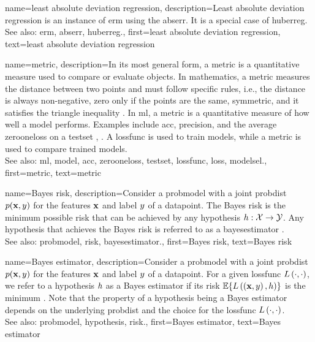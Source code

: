 {name={least absolute deviation regression},
 description={Least absolute deviation regression 
 	is an instance of \gls{erm} using the \gls{abserr}. It is a special case of \gls{huberreg}.
				\\
 See also: \gls{erm}, \gls{abserr}, \gls{huberreg}.},
 first={least absolute deviation regression},
 text={least absolute deviation regression}
}

{name={metric},
  description={In its most general form, a metric is a quantitative measure 
  		used to compare or evaluate objects. In mathematics, a metric measures the distance 
		between two points and must follow specific rules, i.e., the distance is always non-negative, 
		zero only if the points are the same, symmetric, and it satisfies the triangle inequality \cite{RudinBookPrinciplesMatheAnalysis}. 
		In \gls{ml}, a metric is a quantitative measure of how well a \gls{model} performs. Examples include \gls{acc}, 
		precision, and the average \gls{zerooneloss} on a \gls{testset} \cite{Goodfellow-et-al-2016}, \cite{BishopBook}. 
		A \gls{lossfunc} is used to train \glspl{model}, while a metric is used to compare trained \glspl{model}.
		\\ See also: \gls{ml}, \gls{model}, \gls{acc}, \gls{zerooneloss}, \gls{testset}, \gls{lossfunc}, \gls{loss}, \gls{modelsel}.},
	first={metric}, 
  text={metric}
 }

{name={Bayes risk},
 description={Consider a \gls{probmodel} with a joint \gls{probdist} $p({\bf x},y)$ for 
 	the \glspl{feature} ${\bf x}$ and \gls{label} $y$ of a \gls{datapoint}. The 
 	Bayes \gls{risk} is the \gls{minimum} possible \gls{risk} that can be achieved by any \gls{hypothesis} 
$h: \mathcal{X} \rightarrow \mathcal{Y}$. Any \gls{hypothesis} that achieves 
the Bayes \gls{risk} is referred to as a \gls{bayesestimator} \cite{LC}.
		\\
		See also: \gls{probmodel}, \gls{risk}, \gls{bayesestimator}.},
	first={Bayes risk},
	text={Bayes risk}
}
	
{name={Bayes estimator},
  description={Consider a \gls{probmodel} with a joint \gls{probdist} 
  	$p({\bf x},y)$ for the \glspl{feature} ${\bf x}$ and \gls{label} $y$ 
  	of a \gls{datapoint}. For a given \gls{lossfunc} $L\left(\cdot,\cdot \right)$, we refer to a \gls{hypothesis} 
    $h$ as a Bayes estimator if its \gls{risk} $\mathbb{E}\{L\left(\left( {\bf x},y \right),h \right)\}$ is the 
\gls{minimum} \cite{LC}. Note that the property of a \gls{hypothesis} being a Bayes estimator depends on 
the underlying \gls{probdist} and the choice for the \gls{lossfunc} $L\left(\cdot,\cdot \right)$.
		\\
		See also: \gls{probmodel},  \gls{hypothesis}, \gls{risk}.},
		first={Bayes estimator},
 	text={Bayes estimator}
}

